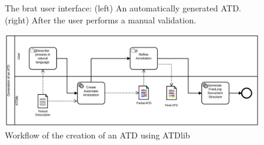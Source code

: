 \begin{figure}[htb]
\begin{minipage}{0.49\textwidth}
  \end{minipage}
  \caption{The brat user interface: (left) An automatically generated
    ATD. (right) After the user performs a manual validation.}
  \label{fig:brat_example}
\end{figure}


\begin{figure}[htb]
  \centering
  \includegraphics[width=\textwidth]{figures/atdlib_bpmn}
  \caption{Workflow of the creation of an ATD using ATDlib}
  \label{fig:atdlib_process}
\end{figure}

